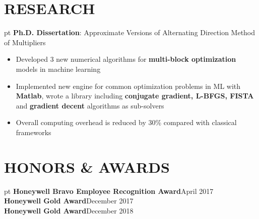 \documentclass[10.5pt]{res} %
\begin{document}
\begin{resume}
\section{RESEARCH}  pt
	\textbf{Ph.D. Dissertation}: Approximate Versions of Alternating Direction Method of Multipliers
	\begin{itemize} pt
		\item Developed 3 new %
		 numerical algorithms for \textbf{multi-block optimization} models in machine learning  %
		\item Implemented new engine for common optimization problems in ML with \textbf{Matlab}, wrote a library including \textbf{conjugate gradient, L-BFGS, FISTA} and \textbf{gradient decent} algorithms as sub-solvers
		\item Overall computing overhead is reduced by 30\% compared with classical frameworks
	\end{itemize}
%
\section{HONORS \& AWARDS}  pt  
\textbf{Honeywell Bravo Employee Recognition Award}\hfill April 2017\\
\textbf{Honeywell Gold Award}\hfill December 2017\\
\textbf{Honeywell Gold Award}\hfill December 2018
%

\end{resume}
\end{document}
